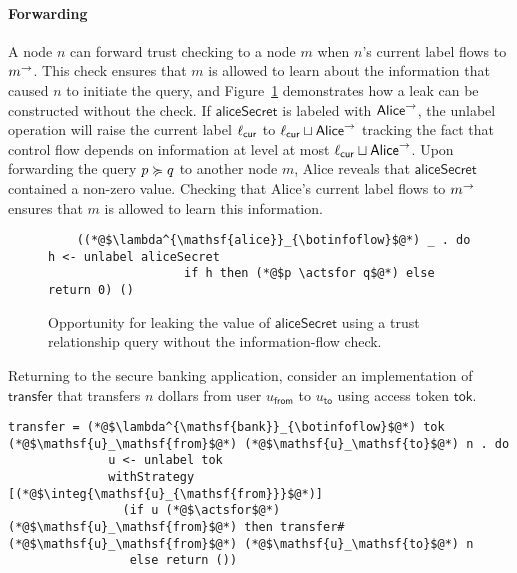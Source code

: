 \paragraph{Forwarding}
A node $n$ can forward trust checking to a node $m$ when $n$'s current label flows to $m^{\rightarrow}$. This check ensures that $m$ is allowed to learn about the information that caused $n$ to initiate the query, and Figure~\ref{fig:leak-via-forward} demonstrates how a leak can be constructed without the check. If $\mathsf{aliceSecret}$ is labeled with $\mathsf{Alice}^{\rightarrow}$, the unlabel operation will raise the current label $\ell_{\mathsf{cur}}$ to $\ell_{\mathsf{cur}} \sqcup \mathsf{Alice}^{\rightarrow}$ tracking the fact that control flow depends on information at level at most $\ell_{\mathsf{cur}} \sqcup \mathsf{Alice}^{\rightarrow}$. Upon forwarding the query $p \succcurlyeq q$ to another node $m$, Alice reveals that $\mathsf{aliceSecret}$ contained a non-zero value. Checking that Alice's current label flows to $m^{\rightarrow}$ ensures that $m$ is allowed to learn this information.

\begin{figure}
    \centering
    \begin{lstlisting}
    ((*@$\lambda^{\mathsf{alice}}_{\botinfoflow}$@*) _ . do h <- unlabel aliceSecret
                   if h then (*@$p \actsfor q$@*) else return 0) ()
    \end{lstlisting}
    \caption{Opportunity for leaking the value of $\mathsf{aliceSecret}$ using a trust relationship query without the information-flow check.}
    \label{fig:leak-via-forward}
\end{figure}

Returning to the secure banking application, consider an implementation of $\mathsf{transfer}$ that transfers $n$ dollars from user $u_\mathsf{from}$ to $u_\mathsf{to}$ using access token $\mathsf{tok}$.

\begin{lstlisting}
transfer = (*@$\lambda^{\mathsf{bank}}_{\botinfoflow}$@*) tok (*@$\mathsf{u}_\mathsf{from}$@*) (*@$\mathsf{u}_\mathsf{to}$@*) n . do
              u <- unlabel tok
              withStrategy [(*@$\integ{\mathsf{u}_{\mathsf{from}}}$@*)]
                (if u (*@$\actsfor$@*) (*@$\mathsf{u}_\mathsf{from}$@*) then transfer# (*@$\mathsf{u}_\mathsf{from}$@*) (*@$\mathsf{u}_\mathsf{to}$@*) n
                 else return ())
\end{lstlisting}

